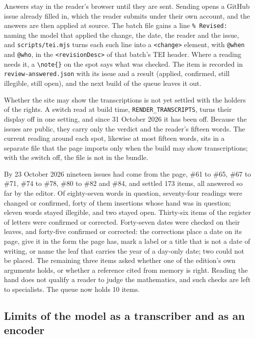 \documentclass[11pt]{article}
\begin{document}
Answers stay in the reader's browser until they are sent. Sending opens a GitHub issue already filled in, which the reader submits under their own account, and the answers are then applied at source. The batch file gains a line \texttt{\% Revised:} naming the model that applied the change, the date, the reader and the issue, and \texttt{scripts/tei.mjs} turns each such line into a \texttt{<change>} element, with \texttt{@when} and \texttt{@who}, in the \texttt{<revisionDesc>} of that batch's TEI header. Where a reading needs it, a \texttt{\textbackslash note\{\}} on the spot says what was checked. The item is recorded in \texttt{review-answered.json} with its issue and a result (applied, confirmed, still illegible, still open), and the next build of the queue leaves it out.

Whether the site may show the transcriptions is not yet settled with the holders of the rights. A switch read at build time, \texttt{RENDER\_TRANSCRIPTS}, turns their display off in one setting, and since 31 October 2026 it has been off. Because the issues are public, they carry only the verdict and the reader's fifteen words. The current reading around each spot, likewise at most fifteen words, sits in a separate file that the page imports only when the build may show transcriptions; with the switch off, the file is not in the bundle.

By 23 October 2026 nineteen issues had come from the page, \#61 to \#65, \#67 to \#71, \#74 to \#78, \#80 to \#82 and \#84, and settled 173 items, all answered so far by the editor. Of eighty-seven words in question, seventy-four readings were changed or confirmed, forty of them insertions whose hand was in question; eleven words stayed illegible, and two stayed open. Thirty-six items of the register of letters were confirmed or corrected. Forty-seven dates were checked on their leaves, and forty-five confirmed or corrected: the corrections place a date on its page, give it in the form the page has, mark a label or a title that is not a date of writing, or name the leaf that carries the year of a day-only date; two could not be placed. The remaining three items asked whether one of the edition's own arguments holds, or whether a reference cited from memory is right. Reading the hand does not qualify a reader to judge the mathematics, and such checks are left to specialists. The queue now holds 10 items.

\subsection{Limits of the model as a transcriber and as an encoder}
\end{document}
